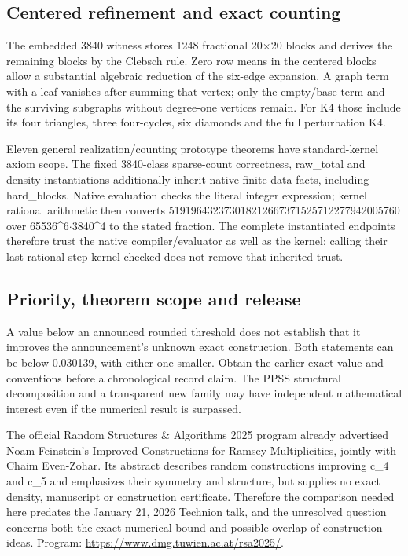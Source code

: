 \documentclass[11pt,a4paper]{article}
\begin{document}
\subsection{Centered refinement and exact counting}
The embedded 3840 witness stores 1248 fractional 20\ensuremath{\times}20 blocks and derives the remaining blocks by the Clebsch rule. Zero row means in the centered blocks allow a substantial algebraic reduction of the six-edge expansion. A graph term with a leaf vanishes after summing that vertex; only the empty/base term and the surviving subgraphs without degree-one vertices remain. For K4 those include its four triangles, three four-cycles, six diamonds and the full perturbation K4.

Eleven general realization/counting prototype theorems have standard-kernel axiom scope. The fixed 3840-class sparse-count correctness, raw\_total and density instantiations additionally inherit native finite-data facts, including hard\_blocks. Native evaluation checks the literal integer expression; kernel rational arithmetic then converts 519196432373018212667371525712277942005760 over 65536\textasciicircum{}6\ensuremath{\cdot}3840\textasciicircum{}4 to the stated fraction. The complete instantiated endpoints therefore trust the native compiler/evaluator as well as the kernel; calling their last rational step kernel-checked does not remove that inherited trust.

\subsection{Priority, theorem scope and release}
A value below an announced rounded threshold does not establish that it improves the announcement's unknown exact construction. Both statements can be below 0.030139, with either one smaller. Obtain the earlier exact value and conventions before a chronological record claim. The PPSS structural decomposition and a transparent new family may have independent mathematical interest even if the numerical result is surpassed.

The official Random Structures \& Algorithms 2025 program already advertised Noam Feinstein's Improved Constructions for Ramsey Multiplicities, jointly with Chaim Even-Zohar. Its abstract describes random constructions improving c\_4 and c\_5 and emphasizes their symmetry and structure, but supplies no exact density, manuscript or construction certificate. Therefore the comparison needed here predates the January 21, 2026 Technion talk, and the unresolved question concerns both the exact numerical bound and possible overlap of construction ideas. Program: \url{https://www.dmg.tuwien.ac.at/rsa2025/}.
\end{document}
